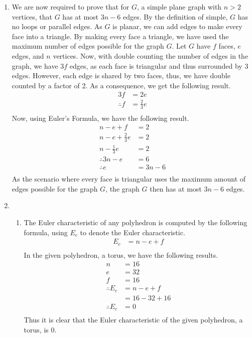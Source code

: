 \documentclass[a4paper]{article}
\begin{document}
\begin{enumerate}[label=\textbf{\arabic*.}]
	\item We are now required to prove that for $\displaystyle{G}$, a simple plane graph with $\displaystyle{n>2}$ vertices, that $\displaystyle{G}$ has at most $\displaystyle{3n-6}$ edges. By the definition of simple, $\displaystyle{G}$ has no loops or parallel edges. As $\displaystyle{G}$ is planar, we can add edges to make every face into a triangle. By making every face a triangle, we have used the maximum number of edges possible for the graph $\displaystyle{G}$. Let $\displaystyle{G}$ have $\displaystyle{f}$ faces, $\displaystyle{e}$ edges, and $\displaystyle{n}$ vertices. Now, with double counting the number of edges in the graph, we have $\displaystyle{3f}$ edges, as each face is triangular and thus surrounded by 3 edges. However, each edge is shared by two faces, thus, we have double counted by a factor of 2. As a consequence, we get the following result.
	\begin{align*}
	3f & = 2e\\
	\therefore f & = \frac{2}{3}e\\
	\end{align*} 
	Now, using Euler's Formula, we have the following result.
	\begin{align*}
	n - e + f & = 2\\
	n - e + \frac{2}{3}e & = 2\\
	n - \frac{1}{3}e & = 2\\
	\therefore 3n - e & = 6\\
	\therefore e & = 3n - 6\\
	\end{align*}
	As the scenario where every face is triangular uses the maximum amount of edges possible for the graph $\displaystyle{G}$, the graph $\displaystyle{G}$ then has at most $\displaystyle{3n-6}$ edges.

	\pagebreak

	\item
	\begin{enumerate} 
		\item The Euler characteristic of any polyhedron is computed by the following formula, using $\displaystyle{E_{c}}$ to denote the Euler characteristic.
		\begin{align*}
		E_{c} & = n - e + f\\
		\end{align*} 
		In the given polyhedron, a torus, we have the following results.
		\begin{align*}
		n & = 16\\
		e & = 32\\
		f & = 16\\
		\therefore E_{c} & = n - e + f\\
		& = 16 - 32 + 16\\
		\therefore E_{c} & = 0\\
		\end{align*}
		Thus it is clear that the Euler characteristic of the given polyhedron, a torus, is 0.


\end{enumerate}
\end{enumerate}
\end{document}
